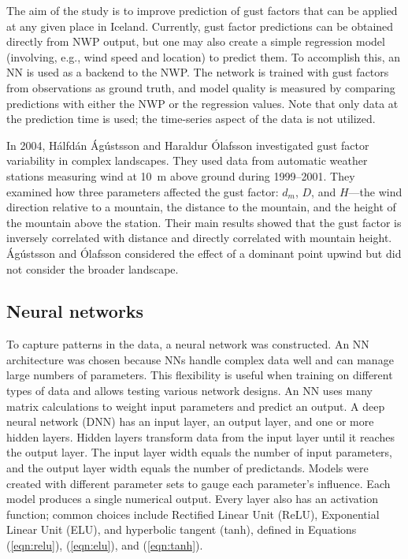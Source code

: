 The aim of the study is to improve prediction of gust factors that can be applied at any given place in Iceland. Currently, gust factor predictions can be obtained directly from NWP output, but one may also create a simple regression model (involving, e.g., wind speed and location) to predict them. To accomplish this, an NN is used as a backend to the NWP. The network is trained with gust factors from observations as ground truth, and model quality is measured by comparing predictions with either the NWP or the regression values. Note that only data at the prediction time is used; the time-series aspect of the data is not utilized.

In 2004, Hálfdán Ágústsson and Haraldur Ólafsson \cite{mean_gust_HA_HO} investigated gust factor variability in complex landscapes. They used data from automatic weather stations measuring wind at 10~m above ground during 1999–2001. They examined how three parameters affected the gust factor: \(d_m\), \(D\), and \(H\)—the wind direction relative to a mountain, the distance to the mountain, and the height of the mountain above the station. Their main results showed that the gust factor is inversely correlated with distance and directly correlated with mountain height. Ágústsson and Ólafsson considered the effect of a dominant point upwind but did not consider the broader landscape.

\subsection{Neural networks}
To capture patterns in the data, a neural network was constructed. An NN architecture was chosen because NNs handle complex data well and can manage large numbers of parameters. This flexibility is useful when training on different types of data and allows testing various network designs. An NN uses many matrix calculations to weight input parameters and predict an output. A deep neural network (DNN) has an input layer, an output layer, and one or more hidden layers. Hidden layers transform data from the input layer until it reaches the output layer. The input layer width equals the number of input parameters, and the output layer width equals the number of predictands. Models were created with different parameter sets to gauge each parameter’s influence. Each model produces a single numerical output. Every layer also has an activation function; common choices include Rectified Linear Unit (ReLU), Exponential Linear Unit (ELU), and hyperbolic tangent (tanh), defined in Equations (\ref{eqn:relu}), (\ref{eqn:elu}), and (\ref{eqn:tanh}).


